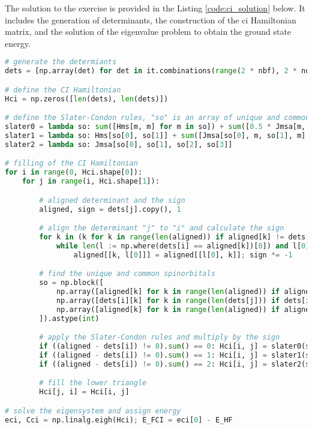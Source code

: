 The solution to the exercise is provided in the Listing \ref{code:ci_solution} below. It includes the generation of determinants, the construction of the \acrshort{ci} Hamiltonian matrix, and the solution of the eigenvalue problem to obtain the ground state energy.

\raggedbottom\begin{lstlisting}[language=Python, caption={\acrshort{ci} exercise code solution.}, label=code:ci_solution]
# generate the determiants
dets = [np.array(det) for det in it.combinations(range(2 * nbf), 2 * nocc)]

# define the CI Hamiltonian
Hci = np.zeros([len(dets), len(dets)])

# define the Slater-Condon rules, "so" is an array of unique and common spinorbitals [unique, common]
slater0 = lambda so: sum([Hms[m, m] for m in so]) + sum([0.5 * Jmsa[m, n, m, n] for m, n in it.product(so, so)])
slater1 = lambda so: Hms[so[0], so[1]] + sum([Jmsa[so[0], m, so[1], m] for m in so[2:]])
slater2 = lambda so: Jmsa[so[0], so[1], so[2], so[3]]

# filling of the CI Hamiltonian
for i in range(0, Hci.shape[0]):
    for j in range(i, Hci.shape[1]):

        # aligned determinant and the sign
        aligned, sign = dets[j].copy(), 1

        # align the determinant "j" to "i" and calculate the sign
        for k in (k for k in range(len(aligned)) if aligned[k] != dets[i][k]):
            while len(l := np.where(dets[i] == aligned[k])[0]) and l[0] != k:
                aligned[[k, l[0]]] = aligned[[l[0], k]]; sign *= -1

        # find the unique and common spinorbitals
        so = np.block([
            np.array([aligned[k] for k in range(len(aligned)) if aligned[k] not in dets[i]]),
            np.array([dets[i][k] for k in range(len(dets[j])) if dets[i][k] not in aligned]),
            np.array([aligned[k] for k in range(len(aligned)) if aligned[k] in dets[i]])
        ]).astype(int)

        # apply the Slater-Condon rules and multiply by the sign
        if ((aligned - dets[i]) != 0).sum() == 0: Hci[i, j] = slater0(so) * sign
        if ((aligned - dets[i]) != 0).sum() == 1: Hci[i, j] = slater1(so) * sign
        if ((aligned - dets[i]) != 0).sum() == 2: Hci[i, j] = slater2(so) * sign

        # fill the lower triangle
        Hci[j, i] = Hci[i, j]

# solve the eigensystem and assign energy
eci, Cci = np.linalg.eigh(Hci); E_FCI = eci[0] - E_HF
\end{lstlisting}
